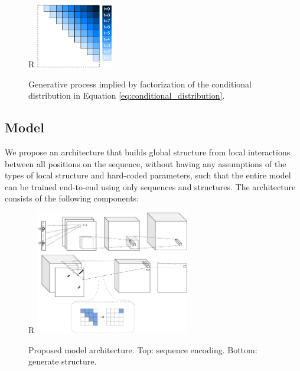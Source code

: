 \documentclass{article}
\begin{document}
\begin{figure}{R}
    \centering
    \includegraphics[width=0.3\textwidth]{plot/autoregressive_direction.pdf}
    \caption{Generative process implied by factorization of the conditional distribution in Equation \ref{eq:conditional_distribution}.}
    \label{fig:autoregressive_direction}
    \centering
\end{figure}




\subsection{Model}


We propose an architecture that builds global structure from local interactions between all positions on the sequence,
without having any assumptions of the types of local structure and hard-coded parameters,
such that the entire model can be trained end-to-end using only sequences and structures.
The architecture consists of the following components:

\begin{figure}{R}
        \centering
        \includegraphics[width=0.6\textwidth]{plot/nn_arch_1.pdf}
        \caption{Proposed model architecture. Top: sequence encoding. Bottom: generate structure.}
        \label{fig:nn_arch_1}
        \centering
\end{figure}
\end{document}
